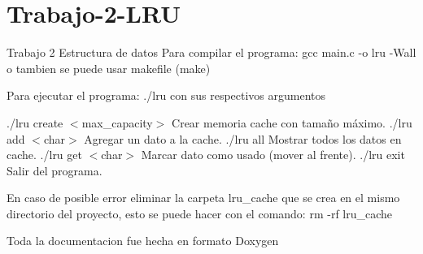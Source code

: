 \chapter{Trabajo-\/2-\/\+LRU}
\hypertarget{md_README}{}\label{md_README}
\label{md_README_autotoc_md0}%
%
Trabajo 2 Estructura de datos Para compilar el programa\+: gcc main.\+c -\/o lru -\/Wall o tambien se puede usar makefile (make)

Para ejecutar el programa\+: ./lru con sus respectivos argumentos

./lru create $<$max\+\_\+capacity$>$ Crear memoria cache con tamaño máximo. ./lru add $<$char$>$ Agregar un dato a la cache. ./lru all Mostrar todos los datos en cache. ./lru get $<$char$>$ Marcar dato como usado (mover al frente). ./lru exit Salir del programa.

En caso de posible error eliminar la carpeta lru\+\_\+cache que se crea en el mismo directorio del proyecto, esto se puede hacer con el comando\+: rm -\/rf lru\+\_\+cache

Toda la documentacion fue hecha en formato Doxygen 
